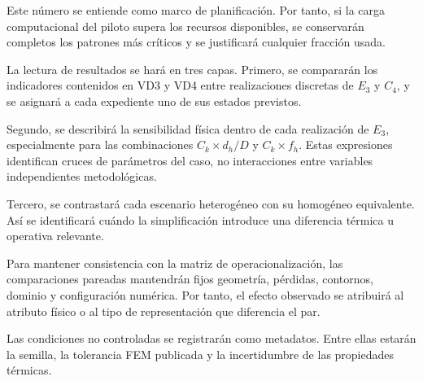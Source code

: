 Este número se entiende como marco de planificación. Por tanto, si la carga computacional del piloto supera los recursos disponibles, se conservarán completos los patrones más críticos y se justificará cualquier fracción usada.

La lectura de resultados se hará en tres capas. Primero, se compararán los indicadores contenidos en VD3 y VD4 entre realizaciones discretas de $E_3$ y $C_4$, y se asignará a cada expediente uno de sus estados previstos.

Segundo, se describirá la sensibilidad física dentro de cada realización de $E_3$, especialmente para las combinaciones $C_k\times d_h/D$ y $C_k\times f_h$. Estas expresiones identifican cruces de parámetros del caso, no interacciones entre variables independientes metodológicas.

Tercero, se contrastará cada escenario heterogéneo con su homogéneo equivalente. Así se identificará cuándo la simplificación introduce una diferencia térmica u operativa relevante.

Para mantener consistencia con la matriz de operacionalización, las comparaciones pareadas mantendrán fijos geometría, pérdidas, contornos, dominio y configuración numérica. Por tanto, el efecto observado se atribuirá al atributo físico o al tipo de representación que diferencia el par.

Las condiciones no controladas se registrarán como metadatos. Entre ellas estarán la semilla, la tolerancia FEM publicada y la incertidumbre de las propiedades térmicas.

